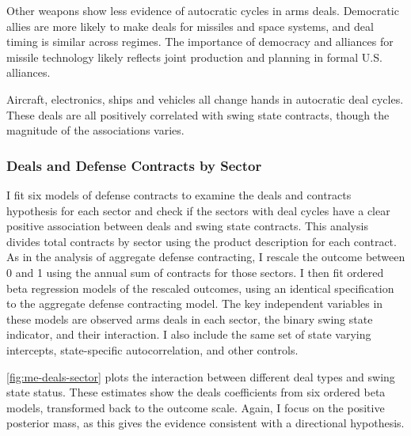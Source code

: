 \documentclass[12pt]{article}
\begin{document}
Other weapons show less evidence of autocratic cycles in arms deals. 
Democratic allies are more likely to make deals for missiles and space systems, and deal timing is similar across regimes. 
The importance of democracy and alliances for missile technology likely reflects joint production and planning in formal U.S. alliances. 


Aircraft, electronics, ships and vehicles all change hands in autocratic deal cycles. 
These deals are all positively correlated with swing state contracts, though the magnitude of the associations varies. 


\subsubsection{Deals and Defense Contracts by Sector}


I fit six models of defense contracts to examine the deals and contracts hypothesis for each sector and check if the sectors with deal cycles have a clear positive association between deals and swing state contracts. 
This analysis divides total contracts by sector using the product description for each contract. 
As in the analysis of aggregate defense contracting, I rescale the outcome between 0 and 1 using the annual sum of contracts for those sectors. 
I then fit ordered beta regression models of the rescaled outcomes, using an identical specification to the aggregate defense contracting model.
The key independent variables in these models are observed arms deals in each sector, the binary swing state indicator, and their interaction. 
I also include the same set of state varying intercepts, state-specific autocorrelation, and other controls. 


\autoref{fig:me-deals-sector} plots the interaction between different deal types and swing state status.  
These estimates show the deals coefficients from six ordered beta models, transformed back to the outcome scale. 
Again, I focus on the positive posterior mass, as this gives the evidence consistent with a directional hypothesis.
\end{document}
